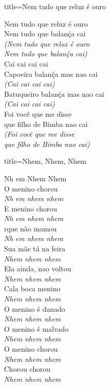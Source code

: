 \documentclass[fontsize=14pt, twoside]{scrreprt}
\begin{document}
\begin{multicols*}{2}
\begin{song}{title={Nem tudo que reluz é ouro}}
        \begin{verse*}
            Nem tudo que reluz é ouro\\
            Nem tudo que balanḉa cai\\
            \textit{(Nem tudo que reluz é ouro}\\
            \textit{Nem tudo que balanḉa cai)}\\
            Cai cai cai cai\\
            Capoeira balanḉa mas nao cai\\
            \textit{(Cai cai cai cai)}\\
            Batuqueiro balanḉa mas nao cai\\
            \textit{(Cai cai cai cai)}\\
            Foi você que me disse\\
            que filho de Bimba nao cai\\
            \textit{(Foi você que me disse}\\
            \textit{que filho de Bimba nao cai)}\\
        \end{verse*}
\end{song}

\begin{song}{title={Nhem, Nhem, Nhem}}
        \begin{verse*}
            Nh em Nhem Nhem\\
            O menino chorou\\
            \textit{Nh} \textit{em nhem nhem}\\
            E menino chorou\\
            \textit{Nh} \textit{em nhem nhem}\\
            rque não mamou\\
            \textit{Nh} \textit{em nhem nhem}\\
            Sua mãe tá na feira\\
            \textit{Nhem nhem nhem}\\
            Ela ainda, nao voltou\\
            \textit{Nhem nhem nhem}\\
            Cala boca menino\\
            \textit{Nhem nhem nhem}\\
            O menino é danado\\
            \textit{Nhem nhem nhem}\\
            O menino é malvado\\
            \textit{Nhem nhem nhem}\\
            O menino chorou\\
            \textit{Nhem nhem nhem}\\
            Chorou chorou\\
            \textit{Nhem nhem nhem}\\
        \end{verse*}
\end{song}


\end{multicols*}
\end{document}

